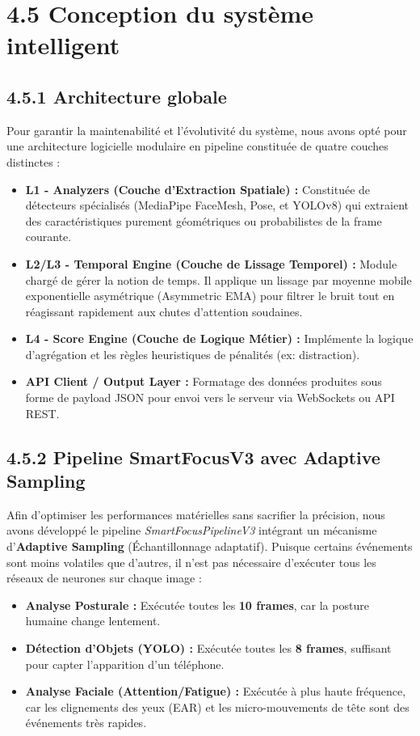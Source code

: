 
\section{4.5 Conception du système intelligent}

\subsection{4.5.1 Architecture globale}
Pour garantir la maintenabilité et l'évolutivité du système, nous avons opté pour une architecture logicielle modulaire en pipeline constituée de quatre couches distinctes :
\begin{itemize}
    \item \textbf{L1 - Analyzers (Couche d'Extraction Spatiale) :} Constituée de détecteurs spécialisés (MediaPipe FaceMesh, Pose, et YOLOv8) qui extraient des caractéristiques purement géométriques ou probabilistes de la frame courante.
    \item \textbf{L2/L3 - Temporal Engine (Couche de Lissage Temporel) :} Module chargé de gérer la notion de temps. Il applique un lissage par moyenne mobile exponentielle asymétrique (Asymmetric EMA) pour filtrer le bruit tout en réagissant rapidement aux chutes d'attention soudaines.
    \item \textbf{L4 - Score Engine (Couche de Logique Métier) :} Implémente la logique d'agrégation et les règles heuristiques de pénalités (ex: distraction).
    \item \textbf{API Client / Output Layer :} Formatage des données produites sous forme de payload JSON pour envoi vers le serveur via WebSockets ou API REST.
\end{itemize}

\subsection{4.5.2 Pipeline SmartFocusV3 avec Adaptive Sampling}
Afin d'optimiser les performances matérielles sans sacrifier la précision, nous avons développé le pipeline \textit{SmartFocusPipelineV3} intégrant un mécanisme d'\textbf{Adaptive Sampling} (Échantillonnage adaptatif). 
Puisque certains événements sont moins volatiles que d'autres, il n'est pas nécessaire d'exécuter tous les réseaux de neurones sur chaque image :
\begin{itemize}
    \item \textbf{Analyse Posturale :} Exécutée toutes les \textbf{10 frames}, car la posture humaine change lentement.
    \item \textbf{Détection d'Objets (YOLO) :} Exécutée toutes les \textbf{8 frames}, suffisant pour capter l'apparition d'un téléphone.
    \item \textbf{Analyse Faciale (Attention/Fatigue) :} Exécutée à plus haute fréquence, car les clignements des yeux (EAR) et les micro-mouvements de tête sont des événements très rapides.
\end{itemize}

